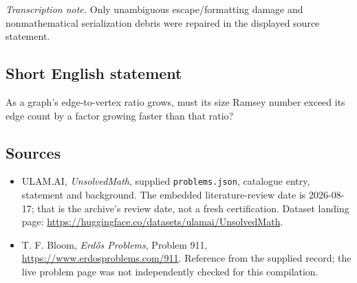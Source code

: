 \documentclass[11pt,a4paper]{article}
\begin{document}
{\small\emph{Transcription note.} Only unambiguous escape/formatting damage and nonmathematical serialization debris were repaired in the displayed source statement.}

\subsection{Short English statement}

As a graph's edge-to-vertex ratio grows, must its size Ramsey number exceed its edge count by a factor growing faster than that ratio?

\subsection{Sources}

{\small

\begin{itemize}

\item[\hypertarget{source:statement:1}{S1}] ULAM.AI, \emph{UnsolvedMath}, supplied \texttt{problems.json}, catalogue entry, statement and background. The embedded literature-review date is 2026-08-17; that is the archive’s review date, not a fresh certification. Dataset landing page: \url{https://huggingface.co/datasets/ulamai/UnsolvedMath}.

\item[\hypertarget{source:statement:2}{S2}] T. F. Bloom, \emph{Erdős Problems}, Problem 911, \url{https://www.erdosproblems.com/911}. Reference from the supplied record; the live problem page was not independently checked for this compilation.

\end{itemize}

}

\label{end:statement}
\end{document}
